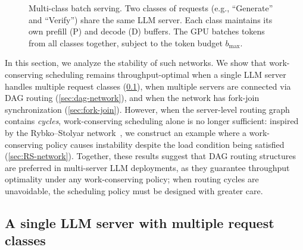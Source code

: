\documentclass[11pt]{article}
\theoremstyle{plain}
\theoremstyle{definition}
\theoremstyle{remark}
\begin{document}
\begin{figure}[t]
\caption{Multi-class batch serving. Two classes of requests (e.g., ``Generate'' and ``Verify'') share the same LLM server. Each class maintains its own prefill (P) and decode (D) buffers. The GPU batches tokens from all classes together, subject to the token budget $b_{\max}$.}
\label{fig:multi-class-batch}
\end{figure}

In this section, we analyze the stability of such networks. We show that work-conserving scheduling remains throughput-optimal when a single LLM server handles multiple request classes (\cref{sec:single-multi-class}), when multiple servers are connected via DAG routing (\cref{sec:dag-network}), and when the network has fork-join synchronization (\cref{sec:fork-join}). However, when the server-level routing graph contains \emph{cycles}, work-conserving scheduling alone is no longer sufficient: inspired by the Rybko--Stolyar network~\citep{rybko1992ergodicity}, we construct an example where a work-conserving policy causes instability despite the load condition being satisfied (\cref{sec:RS-network}). Together, these results suggest that DAG routing structures are preferred in multi-server LLM deployments, as they guarantee throughput optimality under any work-conserving policy; when routing cycles are unavoidable, the scheduling policy must be designed with greater care.

\subsection{A single LLM server with multiple request classes}
\label{sec:single-multi-class}
\end{document}
